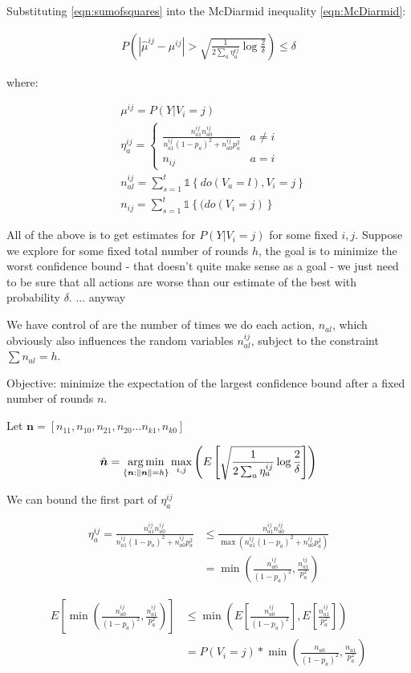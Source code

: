 \documentclass{article}
\newcommand{\set}[1]{\left\{#1\right\}}
\newcommand{\ind}[1]{\mathds{1}\!\!\set{#1}}
\newcommand{\argmin}{\operatornamewithlimits{arg\,min}}
\newcommand{\eqn}[1]{\begin{align}#1\end{align}}
\theoremstyle{plain}
\theoremstyle{definition}
\begin{document}
Substituting \ref{eqn:sumofsquares} into the McDiarmid inequality \ref{eqn:McDiarmid}:

\eqn{
P\left(|\hat{\mu}^{ij} - \mu^{ij}| > \sqrt{\frac{1}{2\sum_a \eta_a^{ij}} \log{\frac{2}{\delta}}}\right) \leq \delta
}

where:

\eqn {
& \mu^{ij} = P(Y | V_i = j) \\
& \eta_a^{ij} = \begin{cases}
\frac{n_{a1}^{ij} n_{a0}^{ij}}{n_{a1}^{ij}(1-p_a)^2+n_{a0}^{ij}p_a^2} & a \neq i\\
n_{ij} & a = i
\end{cases} \\
&n_{al}^{ij} = \sum_{s=1}^t \ind{do(V_a = l), V_i = j} \\
& n_{ij} = \sum_{s=1}^t \ind{(do(V_i = j)}
}






All of the above is to get estimates for $P(Y|V_i = j)$ for some fixed $i,j$. Suppose we explore for some fixed total number of rounds $h$, the goal is to minimize the worst confidence bound - that doesn't quite make sense as a goal - we just need to be sure that all actions are worse than our estimate of the best with probability $\delta$. ... anyway

We have control of are the number of times we do each action, $n_{al}$, which obviously also influences the random variables $n_{al}^{ij}$, subject to the constraint $\sum n_{al} = h$.

Objective: minimize the expectation of the largest confidence bound after a fixed number of rounds $n$. 

Let $\boldsymbol{n} = [n_{11},n_{10},n_{21},n_{20}...n_{k1},n_{k0}]$

\eqn{
\tilde{\boldsymbol{n}} = \argmin_{\{\boldsymbol{n}:\|\boldsymbol{n}\|=h\}} \max_{i,j} \left( E \left[ \sqrt{\frac{1}{2\sum_a \eta_a^{ij}} \log{\frac{2}{\delta}}} \right] \right)
}

We can bound the first part of $\eta_a^{ij}$

\eqn {
\eta_a^{ij} = \frac{n_{a1}^{ij}n_{a0}^{ij}}{n_{a1}^{ij}(1-p_a)^2+n_{a0}^{ij}p_a^2} & \leq \frac{n_{a1}^{ij}n_{a0}^{ij}}{\max(n_{a1}^{ij}(1-p_a)^2+n_{a0}^{ij}p_a^2)} \\
& = \min \left( \frac{n_{a0}^{ij}}{(1-p_a)^2}, \frac{n_{a1}^{ij}}{p_a^2} \right)
}

\eqn {
E \left[ \min \left( \frac{n_{a0}^{ij}}{(1-p_a)^2}, \frac{n_{a1}^{ij}}{p_a^2} \right)  \right] & \leq 
\min \left( E\left[\frac{n_{a0}^{ij}}{(1-p_a)^2} \right], E\left[\frac{n_{a1}^{ij}}{p_a^2} \right] \right) \\
& = P(V_i = j) *\min \left( \frac{n_{a0}}{(1-p_a)^2} , \frac{n_{a1}}{p_a^2}  \right) \\
}
\end{document}
